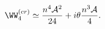 \begin{equation}
\label{respic}
\WW_4^{(cr)}\simeq \frac{n^4{\cal A}^2}{24}+
i \theta \frac{n^3{\cal A}}{4}.
\end{equation}

